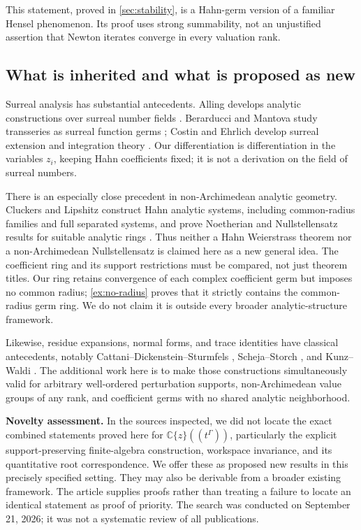 \documentclass[11pt,letterpaper]{article}
\theoremstyle{definition}
\theoremstyle{remark}
\newcommand{\C}{\mathbb C}
\numberwithin{equation}{section}
\begin{document}
This statement, proved in \cref{sec:stability}, is a Hahn-germ version of a familiar Hensel phenomenon. Its proof uses strong summability, not an unjustified assertion that Newton iterates converge in every valuation rank.

\subsection{What is inherited and what is proposed as new}
Surreal analysis has substantial antecedents. Alling develops analytic constructions over surreal number fields \cite{Alling}. Berarducci and Mantova study transseries as surreal function germs \cite{BM}; Costin and Ehrlich develop surreal extension and integration theory \cite{CE}. Our differentiation is differentiation in the variables $z_i$, keeping Hahn coefficients fixed; it is not a derivation on the field of surreal numbers.

There is an especially close precedent in non-Archimedean analytic geometry. Cluckers and Lipshitz construct Hahn analytic systems, including common-radius families and full separated systems, and prove Noetherian and Nullstellensatz results for suitable analytic rings \cite[\S\S3.1, 4.4, 5.2]{CL}. Thus neither a Hahn Weierstrass theorem nor a non-Archimedean Nullstellensatz is claimed here as a new general idea. The coefficient ring and its support restrictions must be compared, not just theorem titles. Our ring retains convergence of each complex coefficient germ but imposes no common radius; \cref{ex:no-radius} proves that it strictly contains the common-radius germ ring. We do not claim it is outside every broader analytic-structure framework.

Likewise, residue expansions, normal forms, and trace identities have classical antecedents, notably Cattani--Dickenstein--Sturmfels \cite{CDS}, Scheja--Storch \cite{SS}, and Kunz--Waldi \cite{KW}. The additional work here is to make those constructions simultaneously valid for arbitrary well-ordered perturbation supports, non-Archimedean value groups of any rank, and coefficient germs with no shared analytic neighborhood.

\textbf{Novelty assessment.} In the sources inspected, we did not locate the exact combined statements proved here for $\C\{z\}((t^\Gamma))$, particularly the explicit support-preserving finite-algebra construction, workspace invariance, and its quantitative root correspondence. We offer these as proposed new results in this precisely specified setting. They may also be derivable from a broader existing framework. The article supplies proofs rather than treating a failure to locate an identical statement as proof of priority. The search was conducted on September 21, 2026; it was not a systematic review of all publications.
\end{document}
